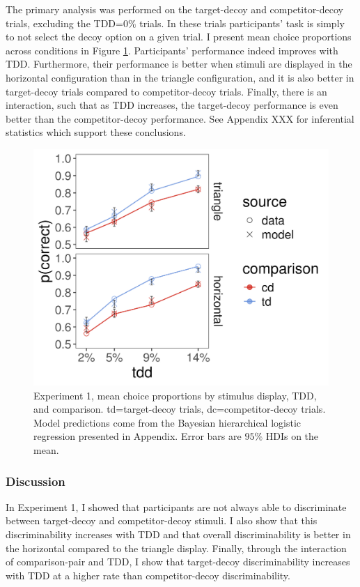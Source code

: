 The primary analysis was performed on the target-decoy and competitor-decoy trials, excluding the TDD=$0\%$ trials. In these trials participants' task is simply to not select the decoy option on a given trial. I present mean choice proportions across conditions in Figure \ref{fig:e1_data}. Participants' performance indeed improves with TDD. Furthermore, their performance is better when stimuli are displayed in the horizontal configuration than in the triangle configuration, and it is also better in target-decoy trials compared to competitor-decoy trials. Finally, there is an interaction, such that as TDD increases, the target-decoy performance is even better than the competitor-decoy performance. See Appendix XXX for inferential statistics which support these conclusions.

\begin{figure}
   \includegraphics[width=\textwidth]{figures/m13_model_preds_v_data.jpeg}
   \caption{Experiment 1, mean choice proportions by stimulus display, TDD, and comparison. td=target-decoy trials, dc=competitor-decoy trials. Model predictions come from the Bayesian hierarchical logistic regression presented in Appendix. Error bars are $95\%$ HDIs on the mean.}
   \label{fig:e1_data}
\end{figure}

\subsubsection{Discussion}
In Experiment 1, I showed that participants are not always able to discriminate between target-decoy and competitor-decoy stimuli. I also show that this discriminability increases with TDD and that overall discriminability is better in the horizontal compared to the triangle display. Finally, through the interaction of comparison-pair and TDD, I show that target-decoy discriminability increases with TDD at a higher rate than competitor-decoy discriminability. 

